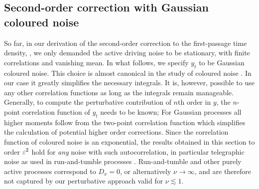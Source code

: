 \documentclass[%
 reprint,
superscriptaddress,
nofootinbib,
 amsmath,amssymb,
 aps,
prx,
]{revtex4-2}
\begin{document}
\subsection{Second-order correction with Gaussian coloured noise}
So far, in our derivation of the second-order correction to the first-passage time density, , we only demanded the active driving noise to be stationary, with finite correlations and vanishing mean. In what follows, we specify $y_t$ to be Gaussian coloured noise. This choice is almost canonical  in the study of coloured noise \cite{hanggi_colored_1995}. In our case it greatly simplifies the necessary integrals. It is, however, possible to use any other correlation functions as long as the integrals remain manageable. Generally, to compute the perturbative contribution of $n$th order in $y$, the $n$-point correlation function of $y_t$ needs to be known; For Gaussian processes all higher moments follow from the two-point correlation function which simplifies the calculation of potential higher order corrections. Since the correlation function of coloured noise is an exponential, the results obtained in this section to order $\varepsilon^2$ hold for \emph{any} noise with such autocorrelation, in particular telegraphic noise as used in run-and-tumble processes \cite{cates_diffusive_2012}. Run-and-tumble and other purely active processes correspond to $D_x = 0$, or alternatively $\nu \to \infty$, and are therefore not captured by our perturbative approach valid for $\nu \lesssim 1$.
\end{document}

